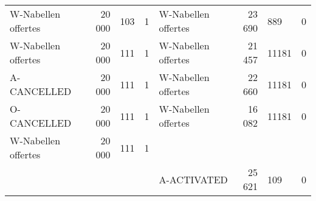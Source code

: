 \begin{table}
\begin{tabular}{lrlrlrlr}
W-Nabellen offertes & 20 000 & 103 & 1 & W-Nabellen offertes & 23 690 & 889 & 0 \\
W-Nabellen offertes & 20 000 & 111 & 1 & W-Nabellen offertes & 21 457 & 11181 & 0 \\
A-CANCELLED & 20 000 & 111 & 1 & W-Nabellen offertes & 22 660 & 11181 & 0 \\
O-CANCELLED & 20 000 & 111 & 1 & W-Nabellen offertes & 16 082 & 11181 & 0 \\
W-Nabellen offertes & 20 000 & 111 & 1 &  &  &  &  \\
 &  &  &  & A-ACTIVATED & 25 621 & 109 & 0 \\
\bottomrule
\end{tabular}
\end{table}
